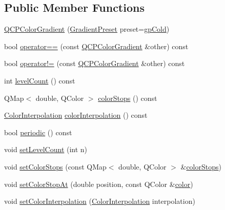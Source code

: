 \subsection*{Public Member Functions}
\begin{DoxyCompactItemize}
\item 
\hyperlink{class_q_c_p_color_gradient_a546e44df5fa1846400a582c041361c85}{Q\+C\+P\+Color\+Gradient} (\hyperlink{class_q_c_p_color_gradient_aed6569828fee337023670272910c9072}{Gradient\+Preset} preset=\hyperlink{class_q_c_p_color_gradient_aed6569828fee337023670272910c9072aec8c001f62c0d5cb853db5fd85309557}{gp\+Cold})
\item 
bool \hyperlink{class_q_c_p_color_gradient_aada47d8206bf2cec77462653bf471c13}{operator==} (const \hyperlink{class_q_c_p_color_gradient}{Q\+C\+P\+Color\+Gradient} \&other) const 
\item 
bool \hyperlink{class_q_c_p_color_gradient_ac641f5d2dc1686201d3cb602c871791d}{operator!=} (const \hyperlink{class_q_c_p_color_gradient}{Q\+C\+P\+Color\+Gradient} \&other) const 
\item 
int \hyperlink{class_q_c_p_color_gradient_ae7537a8e6d0fed3f1928328062bb0f4e}{level\+Count} () const 
\item 
Q\+Map$<$ double, Q\+Color $>$ \hyperlink{class_q_c_p_color_gradient_a64f8aba7826f9c6363aacff8376cef37}{color\+Stops} () const 
\item 
\hyperlink{class_q_c_p_color_gradient_ac5dca17cc24336e6ca176610e7f77fc1}{Color\+Interpolation} \hyperlink{class_q_c_p_color_gradient_a731616fabe6f2e33f71f58dd382359d8}{color\+Interpolation} () const 
\item 
bool \hyperlink{class_q_c_p_color_gradient_a860b7048f877195d2a0fb8d5a7cf5d73}{periodic} () const 
\item 
void \hyperlink{class_q_c_p_color_gradient_a18da587eb4f7fc788ea28ba15b6a12de}{set\+Level\+Count} (int n)
\item 
void \hyperlink{class_q_c_p_color_gradient_a724e828aa6f0ba5011a9392477c35d3a}{set\+Color\+Stops} (const Q\+Map$<$ double, Q\+Color $>$ \&\hyperlink{class_q_c_p_color_gradient_a64f8aba7826f9c6363aacff8376cef37}{color\+Stops})
\item 
void \hyperlink{class_q_c_p_color_gradient_a3b48be5e78079db1bb2a1188a4c3390e}{set\+Color\+Stop\+At} (double position, const Q\+Color \&\hyperlink{class_q_c_p_color_gradient_a0599545c859268b025d2060dea741cea}{color})
\item 
void \hyperlink{class_q_c_p_color_gradient_aa13fda86406e1d896a465a409ae63b38}{set\+Color\+Interpolation} (\hyperlink{class_q_c_p_color_gradient_ac5dca17cc24336e6ca176610e7f77fc1}{Color\+Interpolation} interpolation)

\end{DoxyCompactItemize}
